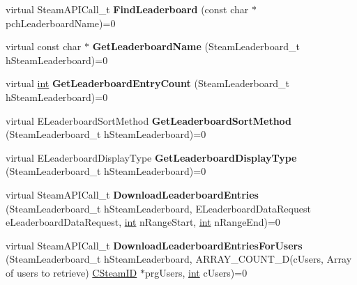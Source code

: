 \begin{DoxyCompactItemize}
\item 
\hypertarget{classISteamUserStats_acf30306ff9798e729cbdf8e092979ffe}{}virtual Steam\+A\+P\+I\+Call\+\_\+t {\bfseries Find\+Leaderboard} (const char $\ast$pch\+Leaderboard\+Name)=0\label{classISteamUserStats_acf30306ff9798e729cbdf8e092979ffe}

\item 
\hypertarget{classISteamUserStats_a5b73997ec50e5789cc48a14b129eba62}{}virtual const char $\ast$ {\bfseries Get\+Leaderboard\+Name} (Steam\+Leaderboard\+\_\+t h\+Steam\+Leaderboard)=0\label{classISteamUserStats_a5b73997ec50e5789cc48a14b129eba62}

\item 
\hypertarget{classISteamUserStats_a4c8c23b7cbc6ef50ab988e481d565282}{}virtual \hyperlink{SDL__thread_8h_a6a64f9be4433e4de6e2f2f548cf3c08e}{int} {\bfseries Get\+Leaderboard\+Entry\+Count} (Steam\+Leaderboard\+\_\+t h\+Steam\+Leaderboard)=0\label{classISteamUserStats_a4c8c23b7cbc6ef50ab988e481d565282}

\item 
\hypertarget{classISteamUserStats_a228d2fbf58844ec409e415a279ef42c1}{}virtual E\+Leaderboard\+Sort\+Method {\bfseries Get\+Leaderboard\+Sort\+Method} (Steam\+Leaderboard\+\_\+t h\+Steam\+Leaderboard)=0\label{classISteamUserStats_a228d2fbf58844ec409e415a279ef42c1}

\item 
\hypertarget{classISteamUserStats_a82c755c4af5bb25d68a26be3d953091e}{}virtual E\+Leaderboard\+Display\+Type {\bfseries Get\+Leaderboard\+Display\+Type} (Steam\+Leaderboard\+\_\+t h\+Steam\+Leaderboard)=0\label{classISteamUserStats_a82c755c4af5bb25d68a26be3d953091e}

\item 
\hypertarget{classISteamUserStats_ab96ab938a0416ec20023b6758311e358}{}virtual Steam\+A\+P\+I\+Call\+\_\+t {\bfseries Download\+Leaderboard\+Entries} (Steam\+Leaderboard\+\_\+t h\+Steam\+Leaderboard, E\+Leaderboard\+Data\+Request e\+Leaderboard\+Data\+Request, \hyperlink{SDL__thread_8h_a6a64f9be4433e4de6e2f2f548cf3c08e}{int} n\+Range\+Start, \hyperlink{SDL__thread_8h_a6a64f9be4433e4de6e2f2f548cf3c08e}{int} n\+Range\+End)=0\label{classISteamUserStats_ab96ab938a0416ec20023b6758311e358}

\item 
\hypertarget{classISteamUserStats_a77830ffadf8e0fb44d56133aa9cc4b68}{}virtual Steam\+A\+P\+I\+Call\+\_\+t {\bfseries Download\+Leaderboard\+Entries\+For\+Users} (Steam\+Leaderboard\+\_\+t h\+Steam\+Leaderboard, A\+R\+R\+A\+Y\+\_\+\+C\+O\+U\+N\+T\+\_\+\+D(c\+Users, Array of users to retrieve) \hyperlink{classCSteamID}{C\+Steam\+I\+D} $\ast$prg\+Users, \hyperlink{SDL__thread_8h_a6a64f9be4433e4de6e2f2f548cf3c08e}{int} c\+Users)=0\label{classISteamUserStats_a77830ffadf8e0fb44d56133aa9cc4b68}


\end{DoxyCompactItemize}
